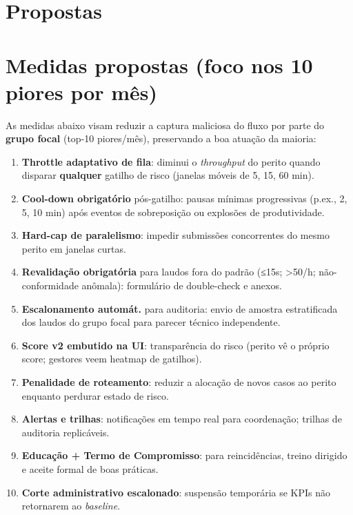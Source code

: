 \documentclass[11pt]{article}
\begin{document}
\section{Propostas}
\label{sec:orgc2a2c1e}
\section{Medidas propostas (foco nos 10 piores por mês)}
\label{sec:orgd284879}
As medidas abaixo visam reduzir a captura maliciosa do fluxo por parte do \textbf{grupo focal} (top-10 piores/mês), preservando a boa atuação da maioria:

\begin{enumerate}
\item \textbf{Throttle adaptativo de fila}: diminui o \emph{throughput} do perito quando disparar \textbf{qualquer} gatilho de risco (janelas móveis de 5, 15, 60 min).
\item \textbf{Cool-down obrigatório} pós-gatilho: pausas mínimas progressivas (p.ex., 2, 5, 10 min) após eventos de sobreposição ou explosões de produtividade.
\item \textbf{Hard-cap de paralelismo}: impedir submissões concorrentes do mesmo perito em janelas curtas.
\item \textbf{Revalidação obrigatória} para laudos fora do padrão (≤15s; >50/h; não-conformidade anômala): formulário de double-check e anexos.
\item \textbf{Escalonamento automát.} para auditoria: envio de amostra estratificada dos laudos do grupo focal para parecer técnico independente.
\item \textbf{Score v2 embutido na UI}: transparência do risco (perito vê o próprio score; gestores veem heatmap de gatilhos).
\item \textbf{Penalidade de roteamento}: reduzir a alocação de novos casos ao perito enquanto perdurar estado de risco.
\item \textbf{Alertas e trilhas}: notificações em tempo real para coordenação; trilhas de auditoria replicáveis.
\item \textbf{Educação + Termo de Compromisso}: para reincidências, treino dirigido e aceite formal de boas práticas.
\item \textbf{Corte administrativo escalonado}: suspensão temporária se KPIs não retornarem ao \emph{baseline}.
\end{enumerate}
\end{document}
